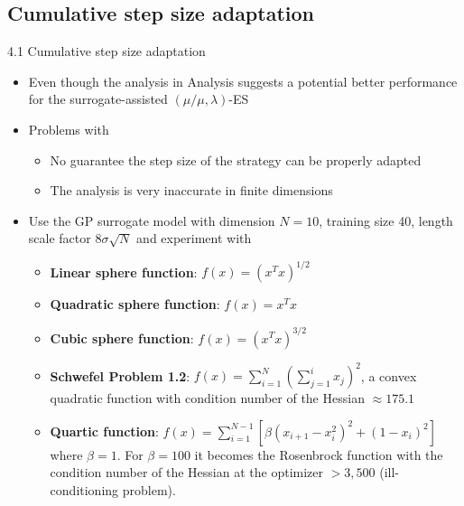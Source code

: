 \documentclass{beamer}
\begin{document}
\subsection{Cumulative step size adaptation}
\begin{frame}{4.1 Cumulative step size adaptation}
\begin{itemize}
    \item Even though the analysis in Analysis suggests a potential better performance for the surrogate-assisted $(\mu/\mu, \lambda)$-ES
    \item Problems with 
    \begin{itemize}
        \item No guarantee the step size of the strategy can be properly adapted
        \item The analysis is very inaccurate in finite dimensions
    \end{itemize}
    \item Use the GP surrogate model with dimension $N=10$, training size 40, length scale factor $8 \sigma \sqrt{N}$ and experiment with 
    \begin{itemize}
        \item \textbf{Linear sphere function}: $f(x) = (x^Tx)^{1/2}$ 
        \item \textbf{Quadratic sphere function}: $f(x) = x^Tx$ 
        \item \textbf{Cubic sphere function}: $f(x) = (x^Tx)^{3/2}$  
        \item \textbf{Schwefel Problem 1.2}: $f(x) = \sum_{i=1}^N(\sum_{j=1}^i x_j)^2$, a convex quadratic function with condition number of the Hessian $\approx175.1$
        \item \textbf{Quartic function}: $f(x) = \sum_{i=1}^{N-1} \left[ \beta(x_{i+1} -x_i^2)^2 + (1-x_i)^2 \right]$ where $\beta = 1$. For $\beta=100$ it becomes the Rosenbrock function with the condition number of the Hessian at the optimizer $>3,500$ (ill-conditioning problem).
    \end{itemize}
\end{itemize}
\end{frame}
\end{document}
